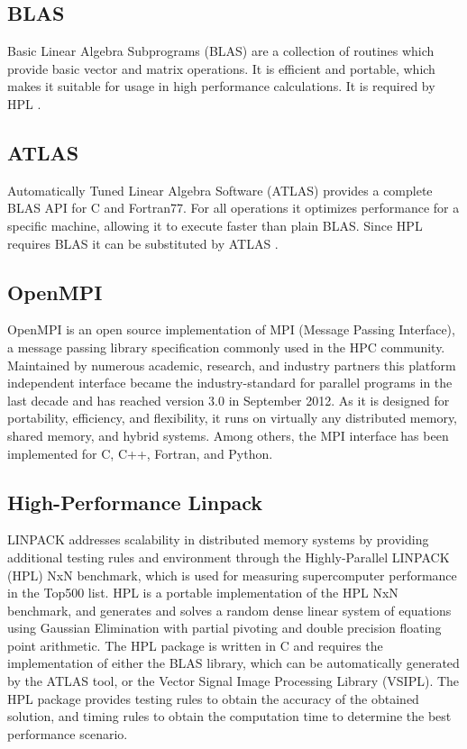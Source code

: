 \documentclass[10pt,twocolumn]{article}
\begin{document}
\subsection{BLAS}
Basic Linear Algebra Subprograms (BLAS) are a collection of routines which provide basic vector and matrix operations. It is efficient and portable, which makes it suitable for usage in high performance calculations. It is required by HPL \cite{blas}.

\subsection{ATLAS}
Automatically Tuned Linear Algebra Software (ATLAS) provides a complete BLAS API for C and Fortran77. For all operations it optimizes performance for a specific machine, allowing it to execute faster than plain BLAS. Since HPL requires BLAS it can be substituted by ATLAS \cite{atlas}.


\subsection{OpenMPI}
OpenMPI is an open source implementation of MPI (Message Passing Interface), a message passing library specification commonly used in the HPC community. Maintained by numerous academic, research, and industry partners this platform independent interface became the industry-standard for parallel programs in the last decade and has reached version 3.0 in September 2012. As it is designed for portability, efficiency, and flexibility, it runs on virtually any distributed memory, shared memory, and hybrid systems. Among others, the MPI interface has been implemented for C, C++, Fortran, and Python.


\subsection{High-Performance Linpack}
LINPACK addresses scalability in distributed memory systems by providing additional testing rules and environment through the Highly-Parallel LINPACK (HPL) NxN benchmark, which is used for measuring supercomputer performance in the Top500 list. HPL is a portable implementation of the HPL NxN benchmark, and generates and solves a random dense linear system of equations using Gaussian Elimination with partial pivoting and double precision floating point arithmetic. The HPL package is written in C and requires the implementation of either the BLAS library, which can be automatically generated by the ATLAS tool, or the Vector Signal Image Processing Library (VSIPL). The HPL package provides testing rules to obtain the accuracy of the obtained solution, and timing rules to obtain the computation time to determine the best performance scenario.  
\end{document}
